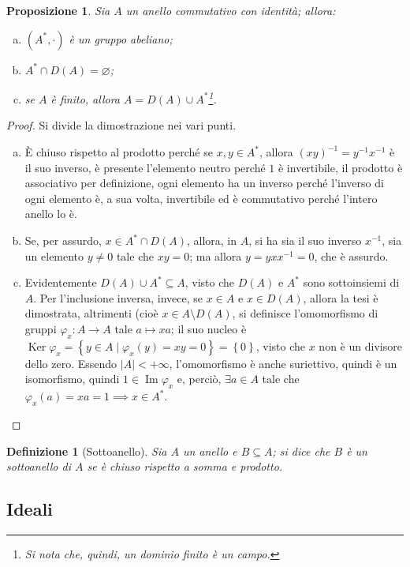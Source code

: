 \documentclass[11pt]{article}
\theoremstyle{style}
\newtheorem{definizione}{Definizione}[section]
\newtheorem{prop}{Proposizione}[section]
\numberwithin{equation}{subsection}
\begin{document}
\begin{prop}
	Sia $A $ un anello commutativo con identit\`a; allora:
	\begin{enumerate}[(a).]
		\item $(A^*,\cdot )$ \`e un gruppo abeliano;
		\item $A^* \cap D(A) = \varnothing$;
		\item se $A$ \`e finito, allora $A = D(A) \cup A^*$\footnote{Si nota che, quindi, un dominio finito \`e un campo.}.
	\end{enumerate}
\end{prop}
	\begin{proof}Si divide la dimostrazione nei vari punti.
		\begin{enumerate}[(a).]
			\item \`E chiuso rispetto al prodotto perch\'e se $x,y \in A^*$, allora $(xy)^{-1}=y^{-1}x^{-1}$ \`e il suo inverso, \`e presente l'elemento neutro perch\'e $1 $ \`e invertibile, il prodotto \`e associativo per definizione, ogni elemento ha un inverso perch\'e l'inverso di ogni elemento \`e, a sua volta, invertibile ed \`e commutativo perch\'e l'intero anello lo \`e.
			\item Se, per assurdo, $x \in A^* \cap D(A)$, allora, in $A$, si ha sia il suo inverso $x^{-1}$, sia un elemento $y\neq 0$ tale che $xy = 0$; ma allora $y = y x x^{-1} = 0$, che \`e assurdo.
			\item Evidentemente $D(A) \cup A^* \subseteq A$, visto che $D(A)$ e $A^*$ sono sottoinsiemi di $A$.
				Per l'inclusione inversa, invece, se $x \in A$ e $x \in D(A)$, allora la tesi \`e dimostrata, altrimenti (cio\`e $x \in A \setminus D(A)$, si definisce l'omomorfismo di gruppi $\varphi _x : A \to A$ tale $a\longmapsto xa$; il suo nucleo \`e $\operatorname{Ker} \varphi_x  = \left\{ y \in  A  \mid \varphi _x(y) = xy = 0 \right\} = \left\{ 0 \right\} $, visto che $x$ non \`e un divisore dello zero.
				Essendo $|A|<+\infty$, l'omomorfismo \`e anche suriettivo, quindi \`e un isomorfismo, quindi $1 \in \operatorname{Im} \varphi _x$ e, perci\`o, $\exists a \in A$ tale che $\varphi _x (a) = xa = 1\implies x \in A^*$.
		\end{enumerate}
	\end{proof}
\begin{definizione}
	[Sottoanello]
	Sia $A$ un anello e $B \subseteq A$; si dice che $B$ \`e un \textit{sottoanello} di $A$ se \`e chiuso rispetto a somma e prodotto.
\end{definizione}
\subsection{Ideali}
\end{document}
